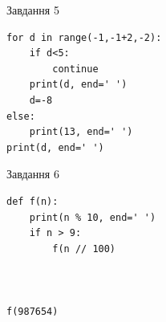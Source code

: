 \documentclass[12pt, ukrainian]{article}
\begin{document}
{\vspace{15mm}
\begin{minipage}[t]{9.7cm}                
{\begin{center}Завдання {5}\end{center}}
\begin{verbatim}
for d in range(-1,-1+2,-2):
    if d<5:
        continue
    print(d, end=' ')
    d=-8
else:
    print(13, end=' ')
print(d, end=' ')
\end{verbatim}     
\end{minipage}
\vline \hspace{8mm}
\begin{minipage}[t]{8.0cm}                
{\begin{center}Завдання {6}\end{center}}
\begin{verbatim}
def f(n):
    print(n % 10, end=' ')
    if n > 9:
        f(n // 100)
    


f(987654)
\end{verbatim}     
\end{minipage}

}
\newpage
\end{document}
